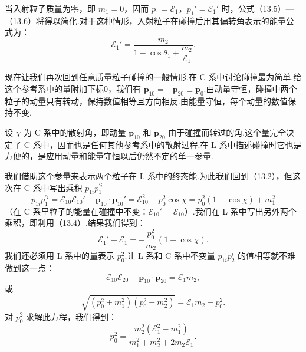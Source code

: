 当入射粒子质量为零，即 $m_1=0$，因而 $p_1=\mathcal{E}_1$，$p_1'=\mathcal{E}_1'$ 时，公式（13.5）—（13.6）将得以简化.对于这种情形，入射粒子在碰撞后用其偏转角表示的能量公式为：
\begin{equation}
  \mathcal{E}_1'=\frac{m_2}{1-\cos\theta_1+\dfrac{m_2}{\mathcal{E}_1}}.
\end{equation}

现在让我们再次回到任意质量粒子碰撞的一般情形.在 C 系中讨论碰撞最为简单.给这个参考系中的量附加下标0，我们有 $\boldsymbol{p}_{10}=-\boldsymbol{p}_{20}\equiv\boldsymbol{p}_0$.由动量守恒，碰撞中两个粒子的动量只有转动，保持数值相等且方向相反.由能量守恒，每个动量的数值保持不变.

设 $\chi$ 为 C 系中的散射角，即动量 $\boldsymbol{p}_{10}$ 和 $\boldsymbol{p}_{20}$ 由于碰撞而转过的角.这个量完全决定了 C 系中，因而也是任何其他参考系中的散射过程.在 L 系中描述碰撞时它也是方便的，是应用动量和能量守恒以后仍然不定的单一参量.

我们借助这个参量来表示两个粒子在 L 系中的终态能.为此我们回到（13.2），但这次在 C 系中写出乘积 $p_{1i}p_1^{\prime i}$
\begin{equation*}
  p_{1i}p_1^{\prime i}=\mathcal{E}_{10}\mathcal{E}_{10}'
  -\boldsymbol{p}_{10}\cdot\boldsymbol{p}_{10}'
  =\mathcal{E}_{10}^2-p_0^2\cos\chi
  =p_0^2(1-\cos\chi)+m_1^2
\end{equation*}
（在 C 系里粒子的能量在碰撞中不变：$\mathcal{E}_{10}'=\mathcal{E}_{10}$）.我们在 L 系中写出另外两个乘积，即利用（13.4）.结果我们得到：
\begin{equation*}
  \mathcal{E}_1'-\mathcal{E}_1=-\frac{p_0^2}{m_2}(1-\cos\chi).
\end{equation*}
我们还必须用 L 系中的量表示 $p_0^2$.让 L 系和 C 系中不变量 $p_{1i}p_2^i$ 的值相等就不难做到这一点：
\begin{equation*}
  \mathcal{E}_{10}\mathcal{E}_{20}-\boldsymbol{p}_{10}\cdot\boldsymbol{p}_{20}
  =\mathcal{E}_1m_2,
\end{equation*}
或
\begin{equation*}
  \sqrt{(p_0^2+m_1^2)(p_0^2+m_2^2)}=\mathcal{E}_1m_2-p_0^2.
\end{equation*}
对 $p_0^2$ 求解此方程，我们得到：
\begin{equation}
  p_0^2=\frac{m_2^2(\mathcal{E}_1^2-m_1^2)}
  {m_1^2+m_2^2+2m_2\mathcal{E}_1}.
\end{equation}

